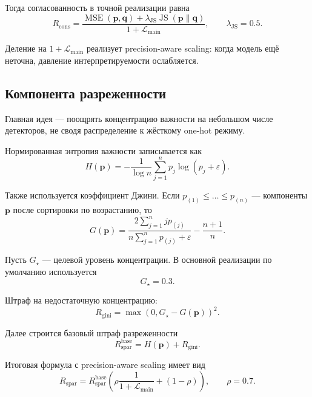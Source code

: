 \documentclass[11pt]{article}
\begin{document}
Тогда согласованность в точной реализации равна
\begin{equation}
R_{\mathrm{cons}} = \frac{\operatorname{MSE}(\mathbf{p},\mathbf{q}) + \lambda_{\mathrm{JS}}\operatorname{JS}(\mathbf{p}\|\mathbf{q})}{1 + \mathcal{L}_{\mathrm{main}}},
\qquad
\lambda_{\mathrm{JS}} = 0.5.
\end{equation}

Деление на $1+\mathcal{L}_{\mathrm{main}}$ реализует precision-aware scaling: когда модель ещё неточна, давление интерпретируемости ослабляется.

\subsection{Компонента разреженности}

Главная идея --- поощрять концентрацию важности на небольшом числе детекторов, не сводя распределение к жёсткому one-hot режиму.

Нормированная энтропия важности записывается как
\begin{equation}
H(\mathbf{p}) = -\frac{1}{\log n} \sum_{j=1}^{n} p_j \log(p_j + \varepsilon).
\end{equation}

Также используется коэффициент Джини. Если $p_{(1)} \le \dots \le p_{(n)}$ --- компоненты $\mathbf{p}$ после сортировки по возрастанию, то
\begin{equation}
G(\mathbf{p}) = \frac{2 \sum_{j=1}^{n} j p_{(j)}}{n \sum_{j=1}^{n} p_{(j)} + \varepsilon} - \frac{n+1}{n}.
\end{equation}

Пусть $G_{\star}$ --- целевой уровень концентрации. В основной реализации по умолчанию используется
\begin{equation}
G_{\star} = 0.3.
\end{equation}

Штраф на недостаточную концентрацию:
\begin{equation}
R_{\mathrm{gini}} = \max(0, G_{\star} - G(\mathbf{p}))^2.
\end{equation}

Далее строится базовый штраф разреженности
\begin{equation}
R_{\mathrm{spar}}^{\mathrm{base}} = H(\mathbf{p}) + R_{\mathrm{gini}}.
\end{equation}

Итоговая формула с precision-aware scaling имеет вид
\begin{equation}
R_{\mathrm{spar}} = R_{\mathrm{spar}}^{\mathrm{base}}
\left(
\rho \frac{1}{1 + \mathcal{L}_{\mathrm{main}}} + (1-\rho)
\right),
\qquad
\rho = 0.7.
\end{equation}
\end{document}
